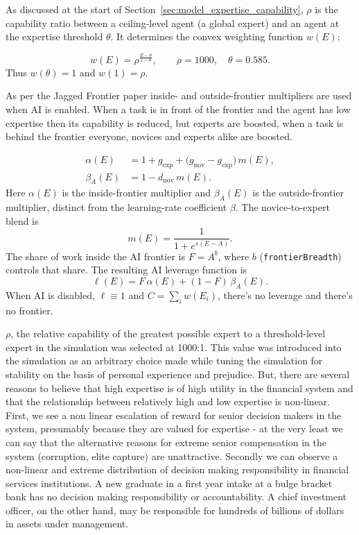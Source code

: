 \documentclass[11pt]{article}
\begin{document}
As discussed at the start of Section~\ref{sec:model_expertise_capability}, $\rho$ is the capability ratio between a ceiling-level agent (a global expert) and an agent at the expertise threshold $\theta$. It determines the convex weighting function $w(E)$:

\begin{equation}\label{eq:expertise_weight}
  w(E) = \rho^{\frac{E-\theta}{1-\theta}}, \qquad \rho = 1000,\quad \theta = 0.585.
\end{equation}
Thus $w(\theta)=1$ and $w(1)=\rho$.

As per the Jagged Frontier paper inside- and outside-frontier multipliers are used when AI is enabled. When a task is in front of the frontier and the agent has low expertise then its capability is reduced, but experts are boosted, when a task is behind the frontier everyone, novices and experts alike are boosted. 

%
\begin{align}
  \alpha(E) &= 1 + g_{\mathrm{exp}} + \bigl(g_{\mathrm{nov}} - g_{\mathrm{exp}}\bigr)\,m(E),\\
  \beta_A(E)  &= 1 - d_{\mathrm{nov}}\,m(E).
\end{align}
Here $\alpha(E)$ is the inside-frontier multiplier and $\beta_A(E)$ is the outside-frontier multiplier, distinct from the learning-rate coefficient $\beta$. The novice-to-expert blend is
\begin{equation}\label{eq:novice_blend}
  m(E) = \frac{1}{1+e^{s(E-A)}}.
\end{equation}
The share of work inside the AI frontier is $F=A^b$, where $b$ (\texttt{frontierBreadth}) controls that share. The resulting AI leverage function is
\begin{equation}\label{eq:leverage}
  \ell(E) = F\,\alpha(E)+(1-F)\,\beta_A(E).
\end{equation}
%
When AI is disabled, $\ell \equiv 1$ and $C = \sum_i w(E_i)$, there's no leverage and there's no frontier. 


$\rho$, the relative capability of the greatest possible expert to a threshold-level expert in the simulation was selected at 1000:1. This value was introduced into the simulation as an arbitrary choice made while tuning the simulation for stability on the basis of personal experience and prejudice. But, there are several reasons to believe that high expertise is of high utility in the financial system and that the relationship between relatively high and low expertise is non-linear. First, we see a non linear escalation of reward for senior decision makers in the system, presumably because they are valued for expertise - at the very least we can say that the alternative reasons for extreme senior compensation in the system (corruption, elite capture) are unattractive. Secondly we can observe a non-linear and extreme distribution of decision making responsibility in financial services institutions. A new graduate in a first year intake at a bulge bracket bank has no decision making responsibility or accountability. A chief investment officer, on the other hand, may be responsible for hundreds of billions of dollars in assets under management.
\end{document}

